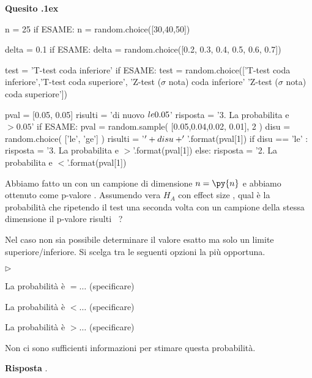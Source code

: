 \documentclass[11pt,twoside,a4paper]{article}
\newcommand{\mylabel}[1]{#1\hfill}
\renewenvironment{itemize}
  {\begin{list}{$\triangleright$}{%
   \setlength{\parskip}{0mm}
   \setlength{\topsep}{.4\baselineskip}
   \setlength{\rightmargin}{0mm}
   \setlength{\listparindent}{0mm}
   \setlength{\itemindent}{0mm}
   \setlength{\labelwidth}{2ex}
   \setlength{\itemsep}{.4\baselineskip}
   \setlength{\parsep}{0mm}
   \setlength{\partopsep}{0mm}
   \setlength{\labelsep}{1ex}
   \setlength{\leftmargin}{\labelwidth+\labelsep}
   \let\makelabel\mylabel}}{%
   \end{list}\vspace*{-1.3mm}}
\newcounter{quesito}
\newenvironment{question}{\bigskip\addtocounter{quesito}{1}\par\textbf{Quesito \thequesito.\kern1ex}}{\vspace{\parskip}}
\newenvironment{answer}{\par\textbf{Risposta\quad}}{\vspace{\parskip}}
\begin{document}
\begin{question} %
\begin{pycode}
n = 25
if ESAME: n = random.choice([30,40,50])

delta = 0.1
if ESAME: delta = random.choice([0.2, 0.3, 0.4, 0.5, 0.6, 0.7])

test = 'T-test coda inferiore'
if ESAME: test = random.choice(['T-test coda inferiore','T-test coda superiore', 'Z-test ($\sigma$ nota) coda inferiore' 'Z-test ($\sigma$ nota) coda superiore'])

pval = [0.05, 0.05]
risulti = 'di nuovo $\\le 0.05$'
risposta = '3. La probabilita e $>0.05$'
if ESAME: 
   pval = random.sample( [0.05,0.04,0.02, 0.01], 2 )
   disu = random.choice( ['le', 'ge'] ) 
   risulti = '$\\' + disu + '{}$'.format(pval[1])
   if disu == 'le' :
      risposta = '3. La probabilita e $>{}$'.format(pval[1])
   else:
      risposta = '2. La probabilita e $<{}$'.format(pval[1])
\end{pycode}
Abbiamo fatto un  con un campione di dimensione $n=\py{n}$ e abbiamo ottenuto come p-valore .
Assumendo vera $H_A$ con effect size , qual è la probabilità che ripetendo il test una seconda volta con un campione della stessa dimensione il p-valore risulti ~?

Nel caso non sia possibile determinare il valore esatto ma solo un limite superiore/inferiore. Si scelga tra le seguenti opzioni la più opportuna.
\begin{itemize}
\item[1.] La probabilità è $=\dots$ (specificare)
\item[2.] La probabilità è $<\dots$ (specificare)
\item[3.] La probabilità è $>\dots$ (specificare)
\item[4.] Non ci sono sufficienti informazioni per stimare questa probabilità.
\end{itemize}
\begin{answer}
{\color{blue}.}
\end{answer}
\end{question}


\clearpage
\end{document}
